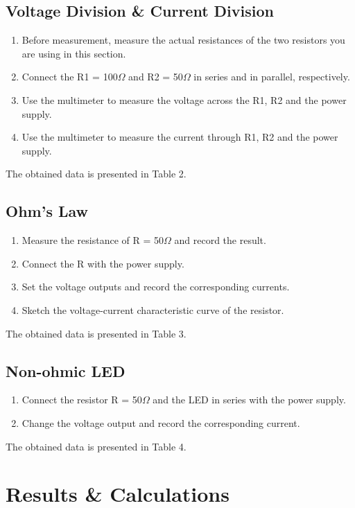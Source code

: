 \documentclass[a4paper]{report}
\begin{document}
	\subsection{Voltage Division \& Current Division}
	\begin{enumerate}[1.]
		\item Before measurement, measure the actual resistances of the two resistors you are using in this section.
		\item Connect the R1 = 100$\Omega$ and R2 = 50$\Omega$ in series and in parallel, respectively.
		\item Use the multimeter to measure the voltage across the R1, R2 and the power supply.
		\item Use the multimeter to measure the current through R1, R2 and the power supply.
	\end{enumerate}
	The obtained data is presented in Table 2.
	\subsection{Ohm's Law}
	\begin{enumerate}[1.]
		\item Measure the resistance of R = 50$\Omega$ and record the result.
		\item Connect the R with the power supply.
		\item Set the voltage outputs and record the corresponding currents.
		\item Sketch the voltage-current characteristic curve of the resistor.
	\end{enumerate}
	The obtained data is presented in Table 3.
	\subsection{Non-ohmic LED}
	\begin{enumerate}[1.]
		\item Connect the resistor R = 50$\Omega$ and the LED in series with the power supply.
		\item Change the voltage output and record the corresponding current.
	\end{enumerate}
	The obtained data is presented in Table 4.
	\section{Results \& Calculations}
\end{document}
